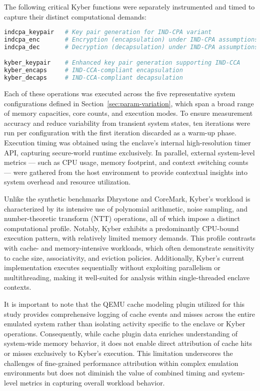 The following critical Kyber functions were separately instrumented and timed to capture their distinct computational demands:

\begin{lstlisting}[language=bash,caption={Kyber cryptographic API functions},label={lst:kyber_api}]
indcpa_keypair   # Key pair generation for IND-CPA variant
indcpa_enc       # Encryption (encapsulation) under IND-CPA assumptions
indcpa_dec       # Decryption (decapsulation) under IND-CPA assumptions

kyber_keypair    # Enhanced key pair generation supporting IND-CCA
kyber_encaps     # IND-CCA-compliant encapsulation
kyber_decaps     # IND-CCA-compliant decapsulation
\end{lstlisting}
Each of these operations was executed across the five representative system configurations defined in Section~\ref{sec:param-variation}, which span a broad range of memory capacities, core counts, and execution modes. To ensure measurement accuracy and reduce variability from transient system states, ten iterations were run per configuration with the first iteration discarded as a warm-up phase. Execution timing was obtained using the enclave’s internal high-resolution timer API, capturing secure-world runtime exclusively. In parallel, external system-level metrics — such as CPU usage, memory footprint, and context switching counts — were gathered from the host environment to provide contextual insights into system overhead and resource utilization.

Unlike the synthetic benchmarks Dhrystone and CoreMark, Kyber’s workload is characterized by its intensive use of polynomial arithmetic, noise sampling, and number-theoretic transform (NTT) operations, all of which impose a distinct computational profile. Notably, Kyber exhibits a predominantly CPU-bound execution pattern, with relatively limited memory demands. This profile contrasts with cache- and memory-intensive workloads, which often demonstrate sensitivity to cache size, associativity, and eviction policies. Additionally, Kyber’s current implementation executes sequentially without exploiting parallelism or multithreading, making it well-suited for analysis within single-threaded enclave contexts.

It is important to note that the QEMU cache modeling plugin \cite{mandour2021cache} utilized for this study provides comprehensive logging of cache events and misses across the entire emulated system rather than isolating activity specific to the enclave or Kyber operations. Consequently, while cache plugin data enriches understanding of system-wide memory behavior, it does not enable direct attribution of cache hits or misses exclusively to Kyber’s execution. This limitation underscores the challenges of fine-grained performance attribution within complex emulation environments but does not diminish the value of combined timing and system-level metrics in capturing overall workload behavior.

